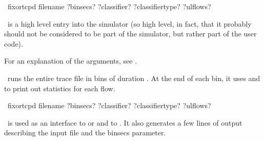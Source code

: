 \documentclass{article}
\begin{document}
\SEEALSO


\manend


\SYNOPSIS \cmdname\ fixortcpd filename ?binsecs? ?classifier?
?classifiertype? ?ulflows?

\cmdname\ is a high level entry into the simulator (so high level, in
fact, that it probably should not be considered to be part of the
simulator, but rather part of the user code).

For an explanation of the arguments, see .

\cmdname\ runs the entire trace file in bins of duration
.  At the end of each bin, it uses
 and  to
print out statistics for each flow.

\SEEALSO


\manend


\SYNOPSIS \cmdname\ fixortcpd filename ?binsecs? ?classifier?
?classifiertype? ?ulflows?

\cmdname\ is used as an interface to  or
 and to .  It also generates
a few lines of output describing the input file and the binsecs
parameter.
\end{document}

